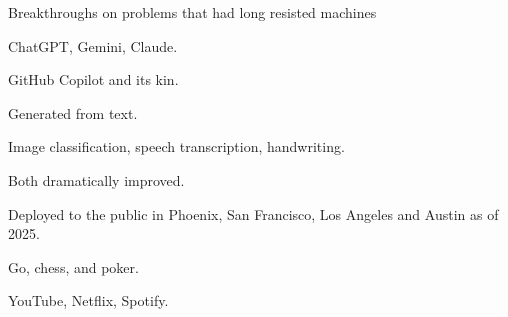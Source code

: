 \documentclass[aspectratio=169,11pt,t]{beamer}
\begin{document}
\begin{frame}[shrink=25]{Breakthroughs on problems that had long resisted machines}
\begin{minipage}[t]{0.241\textwidth}
\begin{icard}
ChatGPT, Gemini, Claude.
\end{icard}
\end{minipage}%
\hfill
\begin{minipage}[t]{0.241\textwidth}
\begin{icard}
GitHub Copilot and its kin.
\end{icard}
\end{minipage}%
\hfill
\begin{minipage}[t]{0.241\textwidth}
\begin{icard}
Generated from text.
\end{icard}
\end{minipage}%
\hfill
\begin{minipage}[t]{0.241\textwidth}
\begin{icard}
Image classification, speech transcription, handwriting.
\end{icard}
\end{minipage}%


\vskip 4pt

\begin{minipage}[t]{0.241\textwidth}
\begin{icard}
Both dramatically improved.
\end{icard}
\end{minipage}%
\hfill
\begin{minipage}[t]{0.241\textwidth}
\begin{icard}
Deployed to the public in Phoenix, San Francisco, Los Angeles and Austin as of 2025.
\end{icard}
\end{minipage}%
\hfill
\begin{minipage}[t]{0.241\textwidth}
\begin{icard}
Go, chess, and poker.
\end{icard}
\end{minipage}%
\hfill
\begin{minipage}[t]{0.241\textwidth}
\begin{icard}
YouTube, Netflix, Spotify.
\end{icard}
\end{minipage}%
\end{frame}
\end{document}
